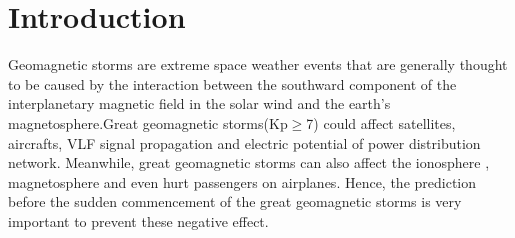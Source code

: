 \documentclass[draft]{agujournal2019}
\begin{document}
%
%

%


%
%
%
%


\section{Introduction}

Geomagnetic storms are extreme space weather events that are generally thought to be caused by the interaction between the southward component of the interplanetary magnetic field in the solar wind and the earth's magnetosphere\cite{Liu2014A}.Great geomagnetic storms(Kp$ \ge $7) could  affect satellites, aircrafts, VLF signal propagation and electric potential of power distribution network\cite{angeo-23-2997-2005, Starodubtsev2019analyzing,Liu2014A}. Meanwhile, great geomagnetic storms can also affect the ionosphere\cite{Kravtsova2016Cosmic,MANDRIKOVA2018116} , magnetosphere\cite{manninen2008} and even hurt passengers on airplanes. Hence, the prediction before the sudden commencement of the great geomagnetic storms is very important to prevent these negative effect.
\end{document}
